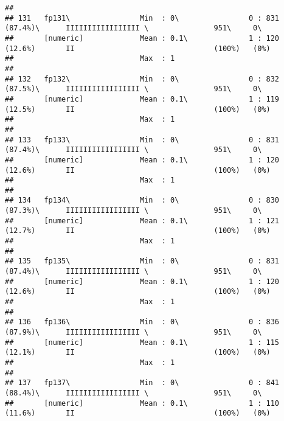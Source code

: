 \documentclass[]{article}
\begin{document}
\begin{verbatim}
## 
## 131   fp131\                Min  : 0\                0 : 831 (87.4%)\      IIIIIIIIIIIIIIIII \               951\     0\       
##       [numeric]             Mean : 0.1\              1 : 120 (12.6%)       II                                (100%)   (0%)     
##                             Max  : 1                                                                                           
## 
## 132   fp132\                Min  : 0\                0 : 832 (87.5%)\      IIIIIIIIIIIIIIIII \               951\     0\       
##       [numeric]             Mean : 0.1\              1 : 119 (12.5%)       II                                (100%)   (0%)     
##                             Max  : 1                                                                                           
## 
## 133   fp133\                Min  : 0\                0 : 831 (87.4%)\      IIIIIIIIIIIIIIIII \               951\     0\       
##       [numeric]             Mean : 0.1\              1 : 120 (12.6%)       II                                (100%)   (0%)     
##                             Max  : 1                                                                                           
## 
## 134   fp134\                Min  : 0\                0 : 830 (87.3%)\      IIIIIIIIIIIIIIIII \               951\     0\       
##       [numeric]             Mean : 0.1\              1 : 121 (12.7%)       II                                (100%)   (0%)     
##                             Max  : 1                                                                                           
## 
## 135   fp135\                Min  : 0\                0 : 831 (87.4%)\      IIIIIIIIIIIIIIIII \               951\     0\       
##       [numeric]             Mean : 0.1\              1 : 120 (12.6%)       II                                (100%)   (0%)     
##                             Max  : 1                                                                                           
## 
## 136   fp136\                Min  : 0\                0 : 836 (87.9%)\      IIIIIIIIIIIIIIIII \               951\     0\       
##       [numeric]             Mean : 0.1\              1 : 115 (12.1%)       II                                (100%)   (0%)     
##                             Max  : 1                                                                                           
## 
## 137   fp137\                Min  : 0\                0 : 841 (88.4%)\      IIIIIIIIIIIIIIIII \               951\     0\       
##       [numeric]             Mean : 0.1\              1 : 110 (11.6%)       II                                (100%)   (0%)     

\end{verbatim}
\end{document}
